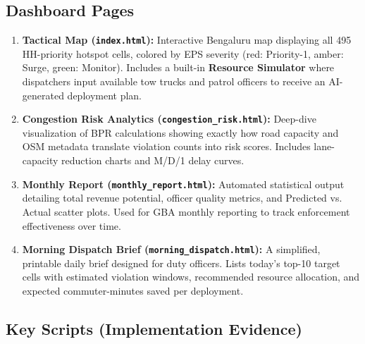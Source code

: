 \documentclass[12pt,a4paper]{article}
\begin{document}
\subsection{Dashboard Pages}

\begin{enumerate}[leftmargin=2em, itemsep=6pt]
    \item \textbf{Tactical Map (\texttt{index.html}):} Interactive Bengaluru map displaying all 495 HH-priority hotspot cells, colored by EPS severity (red: Priority-1, amber: Surge, green: Monitor). Includes a built-in \textbf{Resource Simulator} where dispatchers input available tow trucks and patrol officers to receive an AI-generated deployment plan.
    
    \item \textbf{Congestion Risk Analytics (\texttt{congestion\_risk.html}):} Deep-dive visualization of BPR calculations showing exactly how road capacity and OSM metadata translate violation counts into risk scores. Includes lane-capacity reduction charts and M/D/1 delay curves.
    
    \item \textbf{Monthly Report (\texttt{monthly\_report.html}):} Automated statistical output detailing total revenue potential, officer quality metrics, and Predicted vs. Actual scatter plots. Used for GBA monthly reporting to track enforcement effectiveness over time.
    
    \item \textbf{Morning Dispatch Brief (\texttt{morning\_dispatch.html}):} A simplified, printable daily brief designed for duty officers. Lists today's top-10 target cells with estimated violation windows, recommended resource allocation, and expected commuter-minutes saved per deployment.
\end{enumerate}

\subsection{Key Scripts (Implementation Evidence)}
\end{document}
